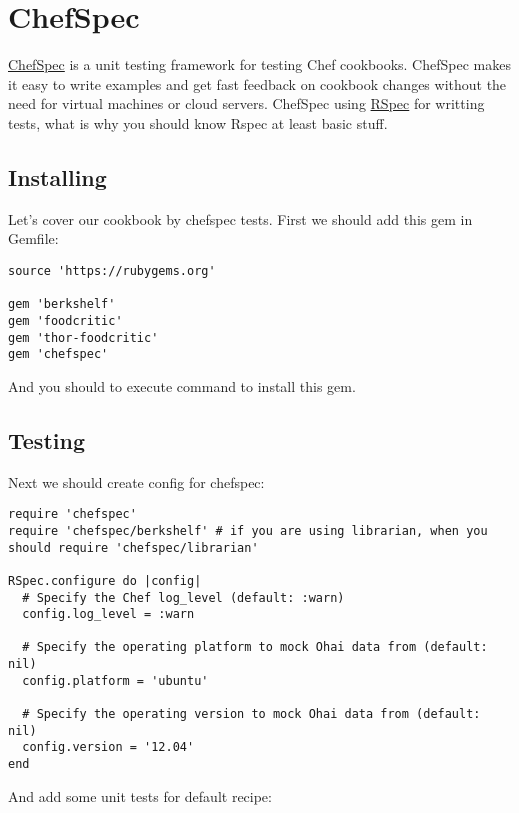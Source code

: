 \section{ChefSpec}
\label{sec:testing-chefspec}

\href{http://code.sethvargo.com/chefspec/}{ChefSpec} is a unit testing framework for testing Chef cookbooks. ChefSpec makes it easy to write examples and get fast feedback on cookbook changes without the need for virtual machines or cloud servers. ChefSpec using \href{http://rspec.info/}{RSpec} for writting tests, what is why you should know Rspec at least basic stuff.

\subsection{Installing}

Let's cover our cookbook by chefspec tests. First we should add this gem in Gemfile:

\begin{lstlisting}[label=lst:testing-chefspec1]
source 'https://rubygems.org'

gem 'berkshelf'
gem 'foodcritic'
gem 'thor-foodcritic'
gem 'chefspec'
\end{lstlisting}

And you should to execute  command to install this gem.

\subsection{Testing}

Next we should create config for chefspec:

\begin{lstlisting}[label=lst:testing-chefspec2,title=my-server-cloud/site-cookbooks/my\_cool\_app/spec/spec\_helper.rb]
require 'chefspec'
require 'chefspec/berkshelf' # if you are using librarian, when you should require 'chefspec/librarian'

RSpec.configure do |config|
  # Specify the Chef log_level (default: :warn)
  config.log_level = :warn

  # Specify the operating platform to mock Ohai data from (default: nil)
  config.platform = 'ubuntu'

  # Specify the operating version to mock Ohai data from (default: nil)
  config.version = '12.04'
end
\end{lstlisting}

And add some unit tests for default recipe:

